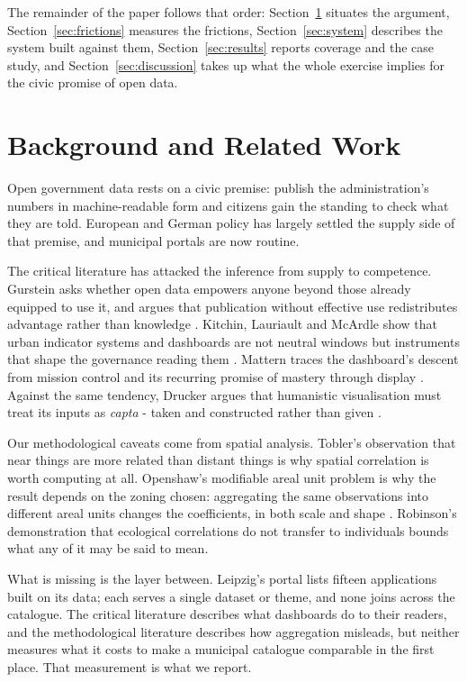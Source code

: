 \documentclass[conference,a4paper]{IEEEtran}
\begin{document}
The remainder of the paper follows that order: Section~\ref{sec:background} situates the argument,
Section~\ref{sec:frictions} measures the frictions, Section~\ref{sec:system} describes the system built against
them, Section~\ref{sec:results} reports coverage and the case study, and
Section~\ref{sec:discussion} takes up what the whole exercise implies for the
civic promise of open data.

\section{Background and Related Work}
\label{sec:background}

Open government data rests on a civic premise: publish the administration's
numbers in machine-readable form and citizens gain the standing to check what
they are told. European and German policy has largely settled the supply side of
that premise, and municipal portals are now routine.

The critical literature has attacked the inference from supply to competence.
Gurstein asks whether open data empowers anyone beyond those already equipped to
use it, and argues that publication without effective use redistributes advantage
rather than knowledge \cite{gurstein2011opendata}. Kitchin, Lauriault and McArdle
show that urban indicator systems and dashboards are not neutral windows but
instruments that shape the governance reading them \cite{kitchin2015knowing}.
Mattern traces the dashboard's descent from mission control and its recurring
promise of mastery through display \cite{mattern2015missioncontrol}. Against the
same tendency, Drucker argues that humanistic visualisation must treat its inputs
as \emph{capta} - taken and constructed rather than given
\cite{drucker2011humanities}.

Our methodological caveats come from spatial analysis. Tobler's observation that
near things are more related than distant things \cite{tobler1970computer} is why
spatial correlation is worth computing at all. Openshaw's modifiable areal unit
problem is why the result depends on the zoning chosen: aggregating the same
observations into different areal units changes the coefficients, in both scale
and shape \cite{openshaw1984maup}. Robinson's demonstration that ecological
correlations do not transfer to individuals \cite{robinson1950ecological} bounds
what any of it may be said to mean.

What is missing is the layer between. Leipzig's portal lists fifteen
applications built on its data; each serves a single dataset or theme, and none
joins across the catalogue. The critical literature describes what dashboards do
to their readers, and the methodological literature describes how aggregation
misleads, but neither measures what it costs to make a municipal catalogue
comparable in the first place. That measurement is what we report.
\end{document}
